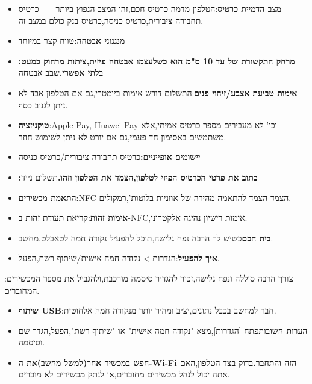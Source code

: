 \begin{itemize}
  \item \textbf{מצב הדמיית כרטיס}:הטלפון מדמה כרטיס חכם,זהו המצב הנפוץ ביותר——כרטיס תחבורה ציבורית,כרטיס כניסה,כרטיס בנק כולם במצב זה.
  \item \textbf{מנגנוני אבטחה:}טווח קצר במיוחד
  \item \textbf{:מרחק התקשורת של עד 10 ס"מ הוא כשלעצמו אבטחה פיזית,ציתות מרחוק כמעט בלתי אפשרי.}שבב אבטחה
\end{itemize}


\begin{itemize}
  \item \textbf{אימות טביעת אצבע/זיהוי פנים}:התשלום דורש אימות ביומטרי,גם אם הטלפון אבד לא ניתן לגנוב כסף.
  \item \textbf{טוקניזציה}:Apple Pay, Huawei Pay וכו' לא מעבירים מספר כרטיס אמיתי,אלא משתמשים באסימון חד-פעמי,גם אם יורט לא ניתן לשימוש חוזר.
  \item \textbf{יישומים אופייניים:}כרטיס תחבורה ציבורית/כרטיס כניסה
  \item \textbf{:כתוב את פרטי הכרטיס הפיזי לטלפון,הצמד את הטלפון וזהו.}תשלום נייד
\end{itemize}


\begin{itemize}
  \item \textbf{התאמת מכשירים}:NFC הצמד-הצמד להתאמה מהירה של אוזניות בלוטות',רמקולים.
  \item \textbf{אימות זהות}:קריאת תעודת זהות ב-NFC,אימות רישיון נהיגה אלקטרוני.
  \item \textbf{בית חכם}כשיש לך הרבה נפח גלישה,תוכל להפעיל נקודה חמה לטאבלט,מחשב.
  \item \textbf{איך להפעיל}:הגדרות > נקודה חמה אישית/שיתוף רשת,הפעל.
\end{itemize}


:צורך הרבה סוללה ונפח גלישה,זכור להגדיר סיסמה מורכבת,ולהגביל את מספר המכשירים המחוברים.

\begin{itemize}
  \item \textbf{שיתוף USB}:חבר למחשב בכבל נתונים,יציב ומהיר יותר מנקודה חמה אלחוטית.
  \item \textbf{הערות חשובות}פתח [הגדרות],מצא "נקודה חמה אישית" או "שיתוף רשת",הפעל,הגדר שם וסיסמה.
  \item \textbf{חפש במכשיר אחר(למשל מחשב)את ה-Wi-Fi הזה והתחבר.}בדוק בצד הטלפון,האם אתה יכול לנהל מכשירים מחוברים,או לנתק מכשירים לא מוכרים.
\end{itemize}

